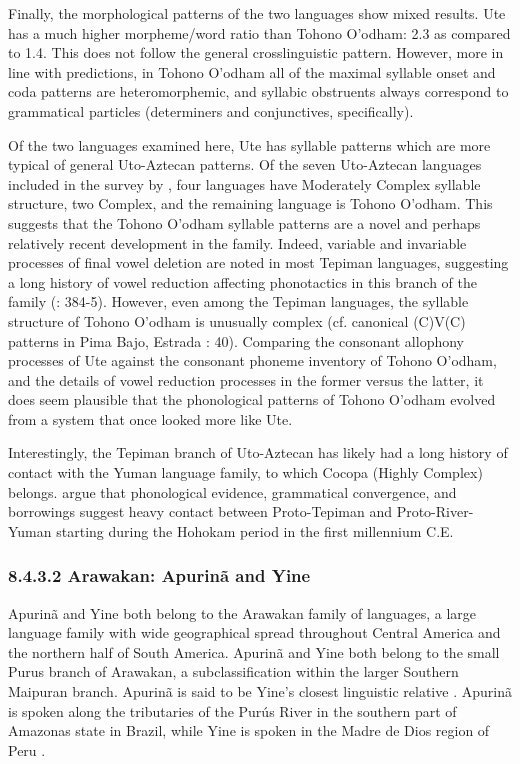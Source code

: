   Finally, the morphological patterns of the two languages show mixed results. Ute has a much higher morpheme/word ratio than Tohono O’odham: 2.3 as compared to 1.4. This does not follow the general crosslinguistic pattern. However, more in line with predictions, in Tohono O’odham all of the maximal syllable onset and coda patterns are heteromorphemic, and syllabic obstruents always correspond to grammatical particles (determiners and conjunctives, specifically).



  Of the two languages examined here, Ute has syllable patterns which are more typical of general Uto-Aztecan patterns. Of the seven Uto-Aztecan languages included in the survey by \citet{Maddieson2013a}, four languages have Moderately Complex syllable structure, two Complex, and the remaining language is Tohono O’odham. This suggests that the Tohono O’odham syllable patterns are a novel and perhaps relatively recent development in the family. Indeed, variable and invariable processes of final vowel deletion are noted in most Tepiman languages, suggesting a long history of vowel reduction affecting phonotactics in this branch of the family (\citealt{ShaulHill1998}: 384-5). However, even among the Tepiman languages, the syllable structure of Tohono O’odham is unusually complex (cf. canonical (C)V(C) patterns in Pima Bajo, Estrada \citealt{Fernández2014}: 40). Comparing the consonant allophony processes of Ute against the consonant phoneme inventory of Tohono O’odham, and the details of vowel reduction processes in the former versus the latter, it does seem plausible that the phonological patterns of Tohono O’odham evolved from a system that once looked more like Ute.



  Interestingly, the Tepiman branch of Uto-Aztecan has likely had a long history of contact with the Yuman language family, to which Cocopa (Highly Complex) belongs. \citet{ShaulHill1998} argue that phonological evidence, grammatical convergence, and borrowings suggest heavy contact between Proto-Tepiman and Proto-River-Yuman starting during the Hohokam period in the first millennium C.E.


\subsubsection{\textbf{8.4.3.2} \textbf{Arawakan:} \textbf{Apurinã} \textbf{and} \textbf{Yine}}

  Apurinã and Yine both belong to the Arawakan family of languages, a large language family with wide geographical spread throughout Central America and the northern half of South America. Apurinã and Yine both belong to the small Purus branch of Arawakan, a subclassification within the larger Southern Maipuran branch. Apurinã is said to be Yine’s closest linguistic relative \citep{Facundes2002}. Apurinã is spoken along the tributaries of the Purús River in the southern part of Amazonas state in Brazil, while Yine is spoken in the Madre de Dios region of Peru \citep{Aikhenvald1999}.



